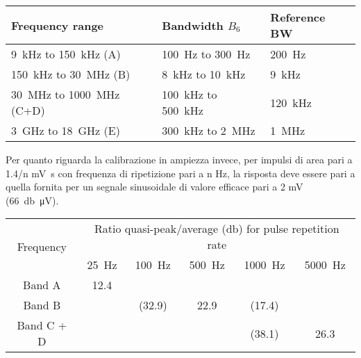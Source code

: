 \begin{center} %
 \begin{tabular}{|>{\centering}m{5cm}|>{\centering}m{3.2cm}|m{3.2cm}<{\centering}|}
  \hline
    \textbf{Frequency range} & \textbf{Bandwidth $B_6$} & \textbf{Reference BW}  \\ \hline
    \SI{9}{\kilo\hertz}   to \SI{150}{\kilo\hertz}  (A)   & \SI{100}{\hertz}      to \SI{300}{\hertz}      & \SI{200}{\hertz}      \\ \hline
    \SI{150}{\kilo\hertz} to \SI{30}{\mega\hertz}   (B)   & \SI{8}{\kilo\hertz}   to \SI{10}{\kilo\hertz}  & \SI{9}{\kilo\hertz}   \\ \hline
    \SI{30}{\mega\hertz}  to \SI{1000}{\mega\hertz} (C+D) & \SI{100}{\kilo\hertz} to \SI{500}{\kilo\hertz} & \SI{120}{\kilo\hertz} \\ \hline
    \SI{3}{\giga\hertz}   to \SI{18}{\giga\hertz}   (E)   & \SI{300}{\kilo\hertz} to \SI{2}{\mega\hertz}   & \SI{1}{\mega\hertz}   \\ \hline
 \end{tabular}
\end{center}

Per quanto riguarda la calibrazione in ampiezza invece, per impulsi di area pari a 
1.4/n \si{\milli\volt\second} con frequenza di ripetizione pari a n \si{\hertz},
la risposta deve essere pari a quella fornita per un segnale sinusoidale di valore efficace
pari a 2 \si{\milli\volt} (\SI{66}{\decibel\micro\volt}).

\begin{table}[h] %
\centering
\begin{tabular}{|c|c|c|c|c|c|}
\hline
\multirow{3}{*}{Frequency} & \multicolumn{5}{c|}{\multirow{2}{*}{Ratio quasi-peak/average (\si{\decibel}) for pulse repetition rate}} \\
                           & \multicolumn{5}{c|}{}                                                                                 \\ \cline{2-6} 
                           & \SI{25}{\hertz}    & \SI{100}{\hertz}   & \SI{500}{\hertz}   & \SI{1000}{\hertz}  & \SI{5000}{\hertz} \\ \hline
Band A                     & 12.4               &                    &                    &                    &                   \\ \hline
Band B                     &                    & (32.9)             & 22.9               & (17.4)             &                   \\ \hline
Band C + D                 &                    &                    &                    & (38.1)             & 26.3              \\ \hline
\end{tabular}
\end{table}

